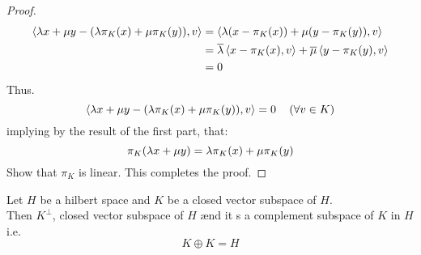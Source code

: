 \begin{proof}
\begin{align*}
\left\langle 
  \lambda x + \mu  y- 
  (\lambda \pi _{K}(x) + \mu \pi _{K}(y) ) , v
\right\rangle &=
\left\langle 
  \lambda(x - \pi _{K}(x) )  + 
  \mu (y - \pi _{K}(y) )  , v
\right\rangle  \\
              &= 
             \overline{\lambda} 
           \left\langle 
             x - \pi _{K}(x), v 
           \right\rangle  + 
           \overline{\mu }
           \left\langle 
             y - \pi _{K}(y) , v
           \right\rangle       \\
              &= 0
\end{align*}
Thus. 
\[
\left\langle 
  \lambda x + \mu  y - 
  (\lambda \pi _{K}(x) + \mu \pi _{K}(y)  ), v
\right\rangle  = 0 
\quad \left( 
  \forall  v \in  K
\right)
\]
implying by the result of the first part, that: 
\[
\pi _{K}(\lambda x + \mu y)  =
\lambda \pi _{K}(x)  + \mu \pi _{K}(y) 
\]
Show that $\pi _{K} $ is linear. This completes
the proof.
\end{proof}
\begin{corollary}[]
Let $H $ be a hilbert space and $K $ 
be a closed vector subspace
of $H $. \\
Then $K^{\bot } $, closed vector subspace 
of $H $ ænd it s a complement subspace
of $K$ in $H $ i.e. 
\[
K \oplus K = H
\]

\end{corollary}
% 
